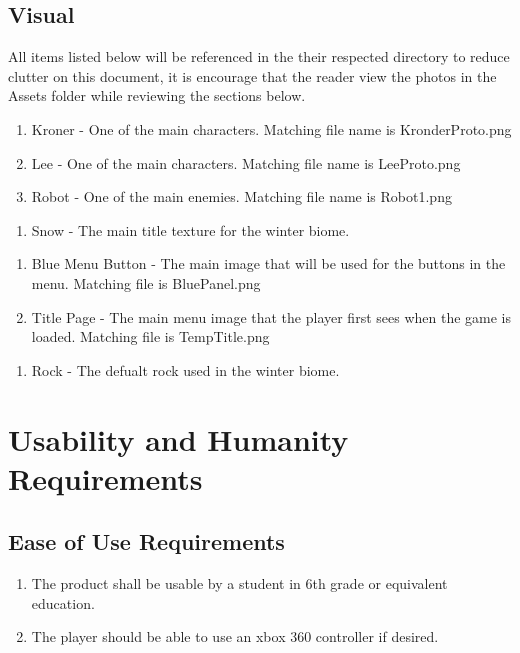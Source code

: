 \documentclass{article}
\begin{document}
\subsection{Visual}
\quad All items listed below will be referenced in the their respected directory to reduce clutter on this document, it is encourage that the reader view the photos in the Assets folder while reviewing the sections below.
\begin{enumerate}[{Sprite}1.]
	\item Kroner - One of the main characters. Matching file name is KronderProto.png
	\item Lee - One of the main characters. Matching file name is LeeProto.png
	\item Robot - One of the main enemies. Matching file name is  Robot1.png
\end{enumerate}
\begin{enumerate}[{Texture}1.]
	\item Snow - The main title texture for the winter biome. %
\end{enumerate}
\begin{enumerate}[{UI}1.]
	\item Blue Menu Button - The main image that will be used for the buttons in the menu. Matching file is BluePanel.png
	\item Title Page - The main menu image that the player first sees when the game is loaded. Matching file is TempTitle.png
\end{enumerate}
\begin{enumerate}[{Environment}1.]
	\item Rock - The defualt rock used in the winter biome. %
\end{enumerate}
\section{Usability and Humanity Requirements}
\subsection{Ease of Use Requirements}
\begin{enumerate}[{EUR}1. ]
	\item The product shall be usable by a student in 6th grade or equivalent education.
	\item The player should be able to use an xbox 360 controller if desired.
\end{enumerate}
\end{document}
